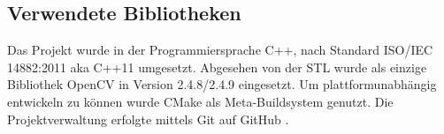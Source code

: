 \documentclass[conference]{IEEEtran}
\begin{document}
\subsection{Verwendete Bibliotheken}
Das Projekt wurde in der Programmiersprache C++, nach Standard ISO/IEC 14882:2011 aka C++11 umgesetzt. Abgesehen von der STL wurde als einzige Bibliothek OpenCV \cite{opencv} in Version 2.4.8/2.4.9 eingesetzt. Um plattformunabhängig entwickeln zu können wurde CMake \cite{cmake} als Meta-Buildsystem genutzt. Die Projektverwaltung erfolgte mittels Git \cite{git} auf GitHub \cite{github}.

%
%



%
%
\end{document}
